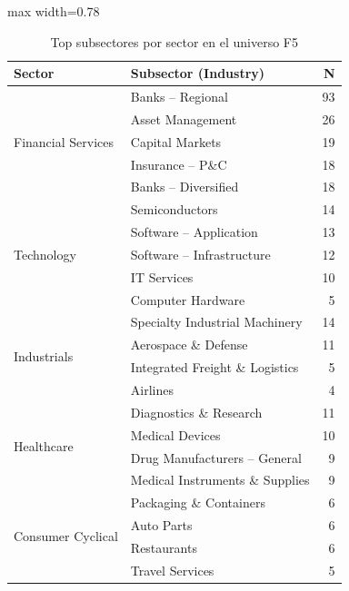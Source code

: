 \begin{table}[H]
  \centering
  \caption{Top subsectores por sector en el universo F5}
  \label{tab:subsectores}
  \scriptsize
  \setlength{\tabcolsep}{2pt}
  \renewcommand{\arraystretch}{0.82}
  \begin{adjustbox}{max width=0.78\textwidth}
  \begin{tabular}{@{}llr@{}}
    \toprule
    \textbf{Sector} & \textbf{Subsector (Industry)} & \textbf{N} \\
    \midrule
    \multirow{5}{*}{Financial Services}
      & Banks -- Regional               & 93 \\
      & Asset Management                & 26 \\
      & Capital Markets                 & 19 \\
      & Insurance -- P\&C               & 18 \\
      & Banks -- Diversified            & 18 \\
    \midrule
    \multirow{5}{*}{Technology}
      & Semiconductors                  & 14 \\
      & Software -- Application         & 13 \\
      & Software -- Infrastructure      & 12 \\
      & IT Services                     & 10 \\
      & Computer Hardware               &  5 \\
    \midrule
    \multirow{4}{*}{Industrials}
      & Specialty Industrial Machinery  & 14 \\
      & Aerospace \& Defense            & 11 \\
      & Integrated Freight \& Logistics &  5 \\
      & Airlines                        &  4 \\
    \midrule
    \multirow{4}{*}{Healthcare}
      & Diagnostics \& Research         & 11 \\
      & Medical Devices                 & 10 \\
      & Drug Manufacturers -- General   &  9 \\
      & Medical Instruments \& Supplies &  9 \\
    \midrule
    \multirow{4}{*}{Consumer Cyclical}
      & Packaging \& Containers         &  6 \\
      & Auto Parts                      &  6 \\
      & Restaurants                     &  6 \\
      & Travel Services                 &  5 \\

\end{tabular}
\end{adjustbox}
\end{table}
